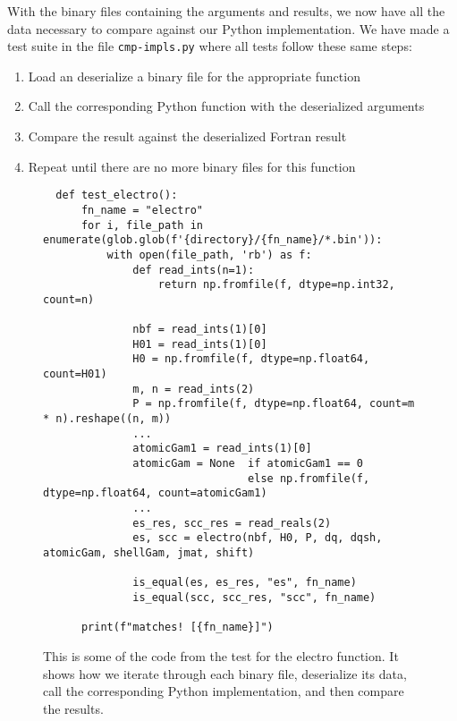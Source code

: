 With the binary files containing the arguments and results, we now have all the data necessary to compare against our Python implementation. We have made a test suite in the file \verb|cmp-impls.py| where all tests follow these same steps:

\begin{enumerate}
   \item Load an deserialize a binary file for the appropriate function
   \item Call the corresponding Python function with the deserialized arguments
   \item Compare the result against the deserialized Fortran result
   \item Repeat until there are no more binary files for this function
\end{enumerate}


\begin{figure}[H]
\begin{verbatim}
  def test_electro():
      fn_name = "electro"
      for i, file_path in enumerate(glob.glob(f'{directory}/{fn_name}/*.bin')):
          with open(file_path, 'rb') as f:
              def read_ints(n=1):
                  return np.fromfile(f, dtype=np.int32, count=n)

              nbf = read_ints(1)[0]
              H01 = read_ints(1)[0]
              H0 = np.fromfile(f, dtype=np.float64, count=H01)
              m, n = read_ints(2)
              P = np.fromfile(f, dtype=np.float64, count=m * n).reshape((n, m))
              ...
              atomicGam1 = read_ints(1)[0]
              atomicGam = None  if atomicGam1 == 0
                                else np.fromfile(f, dtype=np.float64, count=atomicGam1)
              ...
              es_res, scc_res = read_reals(2)
              es, scc = electro(nbf, H0, P, dq, dqsh, atomicGam, shellGam, jmat, shift)

              is_equal(es, es_res, "es", fn_name)
              is_equal(scc, scc_res, "scc", fn_name)

      print(f"matches! [{fn_name}]")
\end{verbatim}
\caption{This is some of the code from the test for the electro function. It shows how we iterate through each binary file, deserialize its data, call the corresponding Python implementation, and then compare the results.}
\label{fig:testcode}
\end{figure}
